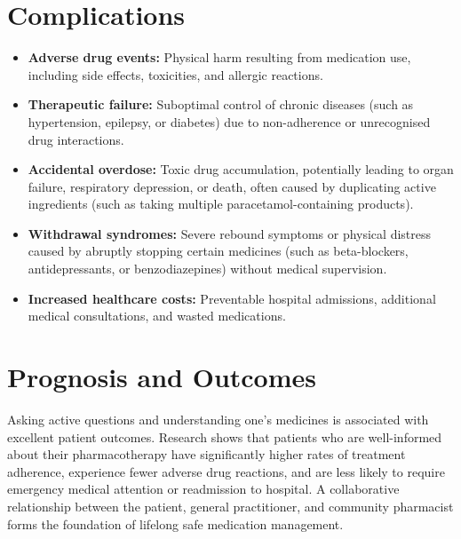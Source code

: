 \section*{Complications}
\begin{itemize}
    \item \textbf{Adverse drug events:} Physical harm resulting from medication use, including side effects, toxicities, and allergic reactions.
    \item \textbf{Therapeutic failure:} Suboptimal control of chronic diseases (such as hypertension, epilepsy, or diabetes) due to non-adherence or unrecognised drug interactions.
    \item \textbf{Accidental overdose:} Toxic drug accumulation, potentially leading to organ failure, respiratory depression, or death, often caused by duplicating active ingredients (such as taking multiple paracetamol-containing products).
    \item \textbf{Withdrawal syndromes:} Severe rebound symptoms or physical distress caused by abruptly stopping certain medicines (such as beta-blockers, antidepressants, or benzodiazepines) without medical supervision.
    \item \textbf{Increased healthcare costs:} Preventable hospital admissions, additional medical consultations, and wasted medications.
\end{itemize}

\section*{Prognosis and Outcomes}
Asking active questions and understanding one's medicines is associated with excellent patient outcomes. Research shows that patients who are well-informed about their pharmacotherapy have significantly higher rates of treatment adherence, experience fewer adverse drug reactions, and are less likely to require emergency medical attention or readmission to hospital. A collaborative relationship between the patient, general practitioner, and community pharmacist forms the foundation of lifelong safe medication management.

